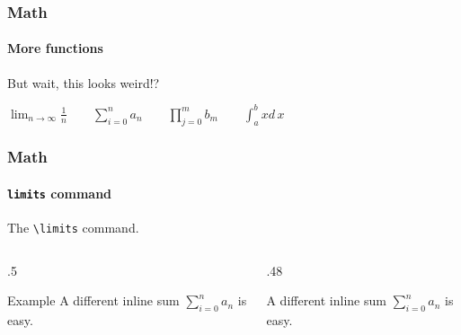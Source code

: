 \begin{frame}
    \frametitle{Math}
    \framesubtitle{More functions}
    \begin{center}
        \Large%
        But wait, this looks weird!?

        \vfill
        $\lim_{n \to \infty} \frac{1}{n}
        \qquad
        \sum_{i = 0}^{n} a_n
        \qquad
        \prod_{j = 0}^{m}b_m
        \qquad
        \int_{a}^{b} x d\,x$

        \vfill
    \end{center}
\end{frame}

\begin{frame}[fragile]
    \frametitle{Math}
    \framesubtitle{\texttt{\bslash limits} command}
    \begin{center}
        \Large%
        The \lstinline|\limits| command.
    \end{center}
    \begin{columns}
        \begin{column}{.5\textwidth}
            \begin{exlisting}{Example}
A different inline sum
$\sum\limits_{i = 0}^{n} a_n$
is easy.
            \end{exlisting}
        \end{column}
        \begin{column}{.48\textwidth}
            \centering
            \vspace{1em}
            
            A different inline sum
            $\sum\limits_{i = 0}^{n} a_n$
            is easy.
        \end{column}
    \end{columns}
\end{frame}

